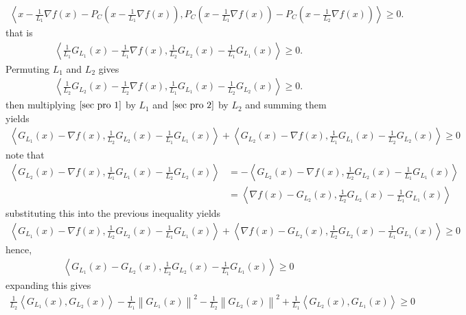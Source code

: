 \documentclass{ExerciseSheet}
\begin{document}
\begin{solution}
\begin{enumerate}
 \begin{align*}
            \left<x-\frac{1}{L_1}\nabla f(x) - P_C\left( x-\frac{1}{L_1}\nabla f(x) \right) , P_C\left(x-\frac{1}{L_1}\nabla f(x) \right) - P_C\left( x - \frac{1}{L_2}\nabla f(x) \right) \right> \geq 0.
        \end{align*}
        that is 
 \begin{align}\label{sec pro 1}
            \left<\frac{1}{L_1}G_{L_1}(x)- \frac{1}{L_1}\nabla f(x), \frac{1}{L_2}G_{L_2}(x)-\frac{1}{L_1}G_{L_1}(x) \right> \geq 0.
        \end{align}
Permuting $L_1$ and $L_2$ gives
         \begin{align}\label{sec pro 2}
            \left<\frac{1}{L_2}G_{L_2}(x)- \frac{1}{L_2}\nabla f(x), \frac{1}{L_1}G_{L_1}(x)-\frac{1}{L_2}G_{L_2}(x) \right> \geq 0.
        \end{align}
then multiplying $\eqref{sec pro 1}$ by $L_1$ and $\eqref{sec pro 2}$ by $L_2$ and summing them yields
        \begin{align*}
            \left<G_{L_1}(x)- \nabla f(x), \frac{1}{L_2}G_{L_2}(x)-\frac{1}{L_1}G_{L_1}(x) \right>+  \left<G_{L_2}(x)- \nabla f(x), \frac{1}{L_1}G_{L_1}(x)-\frac{1}{L_2}G_{L_2}(x) \right> \geq 0
        \end{align*}
        note that 
        \begin{align*}
            \left<G_{L_2}(x)- \nabla f(x), \frac{1}{L_1}G_{L_1}(x)-\frac{1}{L_2}G_{L_2}(x) \right> &= -\left<G_{L_2}(x)- \nabla f(x), \frac{1}{L_2}G_{L_2}(x) -\frac{1}{L_1}G_{L_1}(x) \right>\\
                    &= \left<\nabla f(x)- G_{L_2}(x), \frac{1}{L_2}G_{L_2}(x) -\frac{1}{L_1}G_{L_1}(x) \right>
        \end{align*}
        substituting this into the previous inequality yields
        \begin{align*}
            \left<G_{L_1}(x)- \nabla f(x), \frac{1}{L_2}G_{L_2}(x)-\frac{1}{L_1}G_{L_1}(x) \right>+  \left<\nabla f(x)- G_{L_2}(x), \frac{1}{L_2}G_{L_2}(x) -\frac{1}{L_1}G_{L_1}(x) \right> \geq 0
        \end{align*}
    hence,
        \begin{align*}
            \left<G_{L_1}(x)- G_{L_2}(x), \frac{1}{L_2}G_{L_2}(x)-\frac{1}{L_1}G_{L_1}(x) \right>\geq0
        \end{align*}
        expanding this gives
        \begin{align*}
            \frac{1}{L_2}\left<G_{L_1}(x),G_{L_2}(x)\right>-\frac{1}{L_1}\left\|G_{L_1}(x)\right\|^2-\frac{1}{L_2}\left\|G_{L_2}(x)\right\|^2+ \frac{1}{L_1}\left<G_{L_2}(x),G_{L_1}(x)\right>\geq0

\end{align*}
\end{enumerate}
\end{solution}
\end{document}
